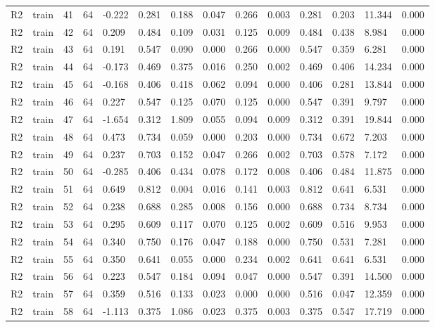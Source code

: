 \begin{table}[t]
\begin{tabular}{llllllllllllll}
R2 & train & 41 & 64 & -0.222 & 0.281 & 0.188 & 0.047 & 0.266 & 0.003 & 0.281 & 0.203 & 11.344 & 0.000 \\
R2 & train & 42 & 64 & 0.209 & 0.484 & 0.109 & 0.031 & 0.125 & 0.009 & 0.484 & 0.438 & 8.984 & 0.000 \\
R2 & train & 43 & 64 & 0.191 & 0.547 & 0.090 & 0.000 & 0.266 & 0.000 & 0.547 & 0.359 & 6.281 & 0.000 \\
R2 & train & 44 & 64 & -0.173 & 0.469 & 0.375 & 0.016 & 0.250 & 0.002 & 0.469 & 0.406 & 14.234 & 0.000 \\
R2 & train & 45 & 64 & -0.168 & 0.406 & 0.418 & 0.062 & 0.094 & 0.000 & 0.406 & 0.281 & 13.844 & 0.000 \\
R2 & train & 46 & 64 & 0.227 & 0.547 & 0.125 & 0.070 & 0.125 & 0.000 & 0.547 & 0.391 & 9.797 & 0.000 \\
R2 & train & 47 & 64 & -1.654 & 0.312 & 1.809 & 0.055 & 0.094 & 0.009 & 0.312 & 0.391 & 19.844 & 0.000 \\
R2 & train & 48 & 64 & 0.473 & 0.734 & 0.059 & 0.000 & 0.203 & 0.000 & 0.734 & 0.672 & 7.203 & 0.000 \\
R2 & train & 49 & 64 & 0.237 & 0.703 & 0.152 & 0.047 & 0.266 & 0.002 & 0.703 & 0.578 & 7.172 & 0.000 \\
R2 & train & 50 & 64 & -0.285 & 0.406 & 0.434 & 0.078 & 0.172 & 0.008 & 0.406 & 0.484 & 11.875 & 0.000 \\
R2 & train & 51 & 64 & 0.649 & 0.812 & 0.004 & 0.016 & 0.141 & 0.003 & 0.812 & 0.641 & 6.531 & 0.000 \\
R2 & train & 52 & 64 & 0.238 & 0.688 & 0.285 & 0.008 & 0.156 & 0.000 & 0.688 & 0.734 & 8.734 & 0.000 \\
R2 & train & 53 & 64 & 0.295 & 0.609 & 0.117 & 0.070 & 0.125 & 0.002 & 0.609 & 0.516 & 9.953 & 0.000 \\
R2 & train & 54 & 64 & 0.340 & 0.750 & 0.176 & 0.047 & 0.188 & 0.000 & 0.750 & 0.531 & 7.281 & 0.000 \\
R2 & train & 55 & 64 & 0.350 & 0.641 & 0.055 & 0.000 & 0.234 & 0.002 & 0.641 & 0.641 & 6.531 & 0.000 \\
R2 & train & 56 & 64 & 0.223 & 0.547 & 0.184 & 0.094 & 0.047 & 0.000 & 0.547 & 0.391 & 14.500 & 0.000 \\
R2 & train & 57 & 64 & 0.359 & 0.516 & 0.133 & 0.023 & 0.000 & 0.000 & 0.516 & 0.047 & 12.359 & 0.000 \\
R2 & train & 58 & 64 & -1.113 & 0.375 & 1.086 & 0.023 & 0.375 & 0.003 & 0.375 & 0.547 & 17.719 & 0.000 \\

\end{tabular}
\end{table}
